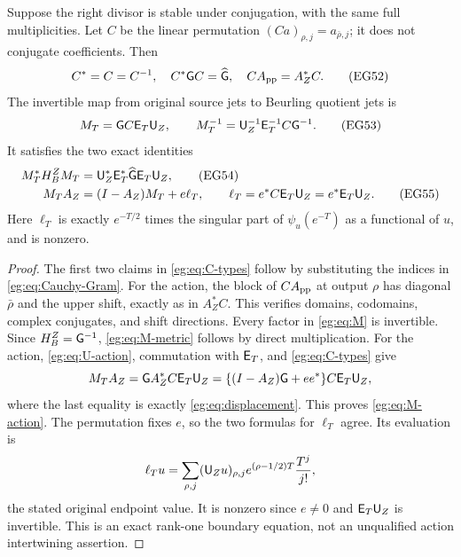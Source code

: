\begin{egtheorem}
\label{eg:thm:typed-boundary}
Suppose the right divisor is stable under conjugation, with the
same full multiplicities. Let $C$ be the linear permutation
$(Ca)_{\rho,j}=a_{\bar\rho,j}$; it does not conjugate coefficients.
Then
\[
 C^*=C=C^{-1},\quad C^*\mathsf G C=\widehat{\mathsf G},\quad
                         C A_{\rm pp}=A_Z^*C.
 \tag{EG52}\label{eg:eq:C-types}
\]
The invertible map from original source jets to Beurling quotient
jets is
\[
 M_T=\mathsf G C\mathsf E_T\mathsf U_Z,\qquad
 M_T^{-1}=\mathsf U_Z^{-1}\mathsf E_T^{-1}C\mathsf G^{-1}.
 \tag{EG53}\label{eg:eq:M}
\]
It satisfies the two exact identities
\begin{align}
 M_T^*H_B^ZM_T&=\mathsf U_Z^*\mathsf E_T^*\widehat{\mathsf G}\mathsf E_T\mathsf U_Z,
                                  \tag{EG54}\label{eg:eq:M-metric}\\
 M_TA_Z&=(I-A_Z)M_T+e\ell_T,\qquad
 \ell_T=e^*C\mathsf E_T\mathsf U_Z=e^*\mathsf E_T\mathsf U_Z.
                                  \tag{EG55}\label{eg:eq:M-action}
\end{align}
Here $\ell_T$ is exactly $e^{-T/2}$ times the singular part of
$\psi_u(e^{-T})$ as a functional of $u$, and is nonzero.
\end{egtheorem}
\begin{proof}
The first two claims in \eqref{eg:eq:C-types} follow by substituting
the indices in \eqref{eg:eq:Cauchy-Gram}. For the action, the block
of $C A_{\rm pp}$ at output $\rho$ has diagonal $\bar\rho$ and
the upper shift, exactly as in $A_Z^*C$. This verifies domains,
codomains, complex conjugates, and shift directions. Every factor
in \eqref{eg:eq:M} is invertible. Since $H_B^Z=\mathsf G^{-1}$,
\eqref{eg:eq:M-metric} follows by direct multiplication.
For the action, \eqref{eg:eq:U-action}, commutation with $\mathsf E_T$, and
\eqref{eg:eq:C-types} give
\[
 M_TA_Z=\mathsf G A_Z^*C\mathsf E_T\mathsf U_Z
       =\{(I-A_Z)\mathsf G+ee^*\}C\mathsf E_T\mathsf U_Z,
\]
where the last equality is exactly \eqref{eg:eq:displacement}.
This proves \eqref{eg:eq:M-action}. The permutation fixes $e$,
so the two formulas for $\ell_T$ agree. Its evaluation is
\[
 \ell_Tu=\sum_{\rho,j}(\mathsf U_Zu)_{\rho,j}
                e^{(\rho-1/2)T}\frac{T^j}{j!},
\]
the stated original endpoint value. It is nonzero since $e\ne0$
and $\mathsf E_T\mathsf U_Z$ is invertible. This is an exact rank-one boundary
equation, not an unqualified action intertwining assertion.
\end{proof}

